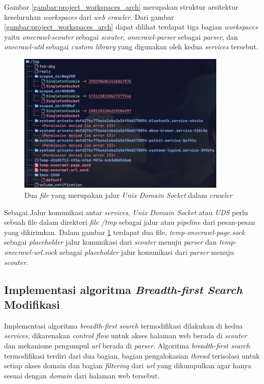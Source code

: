 Gambar \ref{gambar:project_workspaces_arch} merupakan struktur arsitektur keseluruhan \emph{workspaces} dari \emph{web crawler}. Dari gambar \ref{gambar:project_workspaces_arch} dapat dilihat terdapat tiga bagian \emph{workspaces} yaitu \emph{onecrawl-scouter} sebagai \emph{scouter}, \emph{onecrawl-parser} sebagai \emph{parser}, dan \emph{onecrawl-util} sebagai \emph{custom library} yang digunakan oleh kedua \emph{services} tersebut.

\begin{figure}[H]
  \centering
  \includegraphics[keepaspectratio, width=10cm]{gambar/uds_pipe_file.png}
  \caption{Dua \emph{file} yang merupakan jalur \emph{Unix Domain Socket} dalam \emph{crawler}}
  \label{gambar:uds_pipe_file}
\end{figure}

Sebagai Jalur komunikasi antar \emph{services}, \emph{Unix Domain Socket} atau \emph{UDS} perlu sebuah file dalam direktori \emph{file} \emph{/tmp} sebagai jalur atau \emph{pipeline} dari pesan-pesan yang dikirimkan. Dalam gambar \ref{gambar:uds_pipe_file} terdapat dua file, \emph{temp-onecrawl-page.sock} sebagai \emph{placeholder} jalur komunikasi dari \emph{scouter} menuju \emph{parser} dan \emph{temp-onecrawl-url.sock} sebagai \emph{placeholder} jalur komunikasi dari \emph{parser} menuju \emph{scouter}.

\subsection{Implementasi algoritma \emph{Breadth-first Search} Modifikasi}

Implementasi algoritma \emph{breadth-first search} termodifikasi dilakukan di kedua \emph{services}, dikarenakan \emph{control flow} untuk akses halaman web berada di \emph{scouter} dan mekanisme pengumpul \emph{url} berada di \emph{parser}. Algoritma \emph{breadth-first search} termodifikasi terdiri dari dua bagian, bagian pengalokasian \emph{thread} terisolasi untuk setiap akses domain dan bagian \emph{filtering} dari \emph{url} yang dikumpulkan agar hanya sesuai dengan \emph{domain} dari halaman web tersebut.

